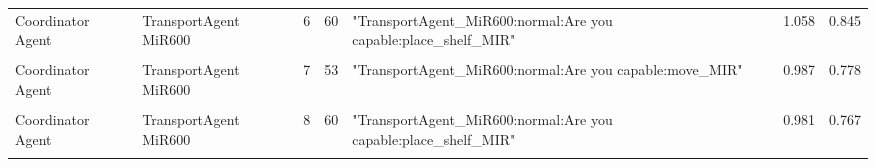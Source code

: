 \begin{table}[b]
\begin{tabular}{m{} m{} m{} m{} m{} m{} m{}}
    Coordinator Agent & TransportAgent MiR600 & 6  & 60  & "TransportAgent\_MiR600:normal:Are you capable:place\_shelf\_MIR"                                                                                                                                                                                                                                                                                                                                                                                                                                                                                                                                                                                                                        & 1.058 & 0.845 \\ 
    & & & & & &\\
    Coordinator Agent & TransportAgent MiR600 & 7  & 53  & "TransportAgent\_MiR600:normal:Are you capable:move\_MIR"                                                                                                                                                                                                                                                                                                                                                                                                                                                                                                                                                                                                                                & 0.987 & 0.778 \\ 
    & & & & & &\\
    Coordinator Agent & TransportAgent MiR600 & 8  & 60  & "TransportAgent\_MiR600:normal:Are you capable:place\_shelf\_MIR"                                                                                                                                                                                                                                                                                                                                                                                                                                                                                                                                                                                                                        & 0.981 & 0.767 \\ 
    & & & & & &\\

\end{tabular}
\end{table}

